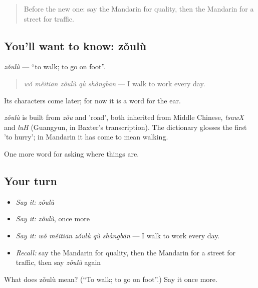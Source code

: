 \label{lesson:ZH-C194-zoulu}



\begin{quote}
Before the new one: say the Mandarin for quality, then the Mandarin for a street for traffic.
\end{quote}

\subsection*{You'll want to know: zǒulù}
\emph{zǒulù} — \textquotedblleft{}to walk; to go on foot\textquotedblright{}.

\begin{quote}
\emph{wǒ měitiān zǒulù qù shàngbān} — I walk to work every day.
\end{quote}

Its characters come later; for now it is a word for the ear.

\begin{cousinweb}
\emph{zǒulù} is built from \emph{zǒu} and  'road', both inherited from Middle Chinese, \emph{tsuwX} and \emph{luH} (Guangyun, in Baxter's transcription). The dictionary glosses the first 'to hurry'; in Mandarin it has come to mean walking.
\end{cousinweb}

\begin{grammarlens}[title={What you've built}]
One more word for asking where things are.
\end{grammarlens}

\subsection*{Your turn}
\begin{itemize}
\raggedright
  \item \emph{Say it:} \emph{zǒulù}
  \item \emph{Say it:} \emph{zǒulù}, once more
  \item \emph{Say it:} \emph{wǒ měitiān zǒulù qù shàngbān} — I walk to work every day.
  \item \emph{Recall:} say the Mandarin for quality, then the Mandarin for a street for traffic, then say \emph{zǒulù} again
\end{itemize}

\begin{tcolorbox}[breakable,colback=teal!4,colframe=teal!35!black,title={Before you move on}]
What does zǒulù mean? (\textquotedblleft{}To walk; to go on foot\textquotedblright{}.) Say it once more.
\end{tcolorbox}
